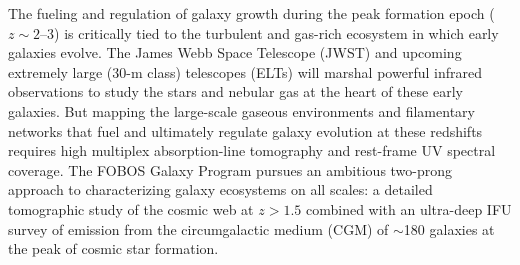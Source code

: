 \documentclass[oneside,11pt]{amsart}
\begin{document}
The fueling and regulation of galaxy growth during the peak formation epoch ($z \sim2$--3) is critically tied to the turbulent and gas-rich ecosystem in which early galaxies evolve. The James Webb Space Telescope (JWST) and upcoming extremely large (30-m class) telescopes (ELTs) will marshal powerful infrared observations to study the stars and nebular gas at the heart of these early galaxies. But mapping the large-scale gaseous environments and filamentary networks that fuel and ultimately regulate galaxy evolution at these redshifts requires high multiplex absorption-line tomography and rest-frame UV spectral coverage.  The FOBOS Galaxy Program pursues an ambitious two-prong approach to characterizing galaxy ecosystems on all scales: a detailed tomographic study of the cosmic web at $z>1.5$ combined with an ultra-deep IFU survey of emission from the circumgalactic medium (CGM) of $\sim$180 galaxies at the peak of cosmic star formation.



\end{document}
